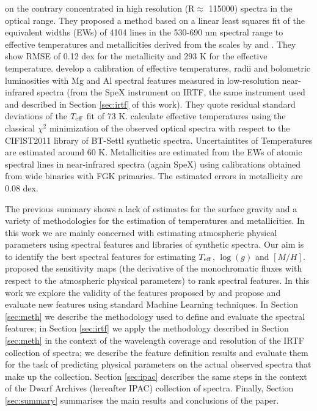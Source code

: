 \cite{2014A&A...568A.121N} on the contrary concentrated in
high resolution (R$\approx$ 115000) spectra in the optical range.
They proposed a method based on a linear least squares fit of the
equivalent widths (EWs) of 4104 lines in the 530-690 nm spectral range
to effective temperatures and metallicities derived from the scales
by \cite{2012A&A...538A..25N} and \cite{2008MNRAS.389..585C}.  They
show RMSE of 0.12 dex for the metallicity and 293 K for the effective
temperature. \cite{2015ApJ...800...85N} develop a calibration of
effective temperatures, radii and bolometric luminosities with Mg and
Al spectral features measured in low-resolution near-infrared spectra
(from the SpeX instrument on IRTF, the same instrument used and
described in Section \ref{sec:irtf} of this work).  They quote
residual standard deviations of the $T_{\rm eff}$ fit of 73
K. \cite{Mann2015} calculate effective temperatures using the
classical $\chi^2$ minimization of the observed optical spectra with
respect to the CIFIST2011 library of BT-Settl synthetic spectra.
Uncertaintites of Temperatures are estimated around 60 K.
Metallicities are estimated from the EWs of atomic spectral lines in
near-infrared spectra (again SpeX) using calibrations obtained from
wide binaries with FGK primaries. The estimated errors in metallicity
are 0.08 dex.

The previous summary shows a lack of estimates for the surface gravity
and a variety of methodologies for the estimation of temperatures and
metallicities. In this work we are mainly concerned with estimating
atmospheric physical parameters using spectral features and libraries
of synthetic spectra. Our aim is to identify the best spectral
features for estimating $T_{\rm eff}$, $\log(g)$ and
$[M/H]$. \cite{cesetti} proposed the sensitivity maps (the derivative
of the monochromatic fluxes with respect to the atmospheric physical
parameters) to rank spectral features. In this work we explore the
validity of the features proposed by \cite{cesetti} and propose and
evaluate new features using standard Machine Learning techniques. In
Section \ref{sec:meth} we describe the methodology used to define and
evaluate the spectral features; in Section \ref{sec:irtf} we apply the
methodology described in Section \ref{sec:meth} in the context of the
wavelength coverage and resolution of the IRTF collection of spectra;
we describe the feature definition results and evaluate them for the
task of predicting physical parameters on the actual observed spectra
that make up the collection. Section \ref{sec:ipac} describes the same
steps in the context of the Dwarf Archives (hereafter IPAC) collection
of spectra. Finally, Section \ref{sec:summary} summarises the main
results and conclusions of the paper.
